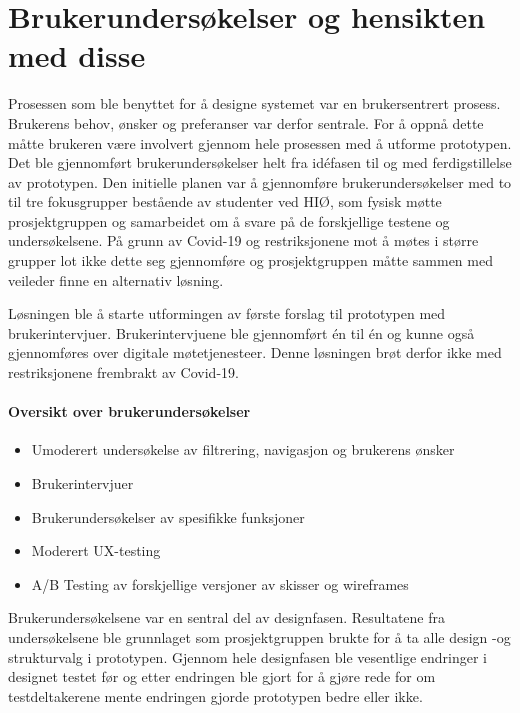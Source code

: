 \section{Brukerundersøkelser og hensikten med disse}
Prosessen som ble benyttet for å designe systemet var en brukersentrert prosess. Brukerens behov, ønsker og preferanser var derfor sentrale. For å oppnå dette måtte brukeren være involvert gjennom hele prosessen med å utforme prototypen. Det ble gjennomført brukerundersøkelser helt fra idéfasen til og med ferdigstillelse av prototypen.
Den initielle planen var å gjennomføre brukerundersøkelser med to til tre fokusgrupper bestående av studenter ved HIØ, som fysisk møtte prosjektgruppen og samarbeidet om å svare på de forskjellige testene og undersøkelsene. På grunn av Covid-19 og restriksjonene mot å møtes i større grupper lot ikke dette seg gjennomføre og prosjektgruppen måtte sammen med veileder finne en alternativ løsning.

Løsningen ble å starte utformingen av første forslag til prototypen med brukerintervjuer. Brukerintervjuene ble gjennomført én til én og kunne også gjennomføres over digitale møtetjenesteer. Denne løsningen brøt derfor ikke med restriksjonene frembrakt av Covid-19.

\paragraph{Oversikt over brukerundersøkelser}
\begin{itemize}
\item Umoderert undersøkelse av filtrering, navigasjon og brukerens ønsker
\item Brukerintervjuer
\item Brukerundersøkelser av spesifikke funksjoner
\item Moderert UX-testing
\item A/B Testing av forskjellige versjoner av skisser og wireframes
\end{itemize}

Brukerundersøkelsene var en sentral del av designfasen. Resultatene fra undersøkelsene ble grunnlaget som prosjektgruppen brukte for å ta alle design -og strukturvalg i prototypen. Gjennom hele designfasen ble vesentlige endringer i designet testet før og etter endringen ble gjort for å gjøre rede for om testdeltakerene mente endringen gjorde prototypen bedre eller ikke.

